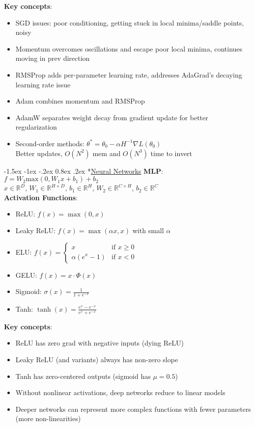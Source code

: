 \documentclass{article}
\makeatletter
\renewcommand\section{\@startsection{section}{1}{\z@}%
                                  {-1.5ex \@plus -1ex \@minus -.2ex}%
                                  {0.8ex \@plus.2ex}%
                                  {\normalfont\small\bfseries}}
\makeatother
\begin{document}
\begin{multicols}{3}
\textbf{Key concepts}:
\begin{itemize}
\item SGD issues: poor conditioning, getting stuck in local minima/saddle points, noisy
\item Momentum overcomes oscillations and escape poor local minima, continues moving in prev direction
\item RMSProp adds per-parameter learning rate, addresses AdaGrad's decaying learning rate issue
\item Adam combines momentum and RMSProp
\item AdamW separates weight decay from gradient update for better regularization
\item Second-order methods: $\theta^* = \theta_0 - \alpha H^{-1} \nabla L(\theta_0)$\\
Better updates, $O(N^2)$ mem and $O(N^3)$ time to invert
\end{itemize}

\section*{\underline{Neural Networks}}
\textbf{MLP}: $f = W_2 \text{max}(0, W_1 x + b_1) + b_2$\\
$x \in \mathbb{R}^D$, $W_1 \in \mathbb{R}^{H \times D}$, $b_1 \in \mathbb{R}^H$, $W_2 \in \mathbb{R}^{C \times H}$, $b_2 \in \mathbb{R}^C$\\
\textbf{Activation Functions}:
\begin{itemize}
\item ReLU: $f(x) = \max(0, x)$
\item Leaky ReLU: $f(x) = \max(\alpha x, x)$ with small $\alpha$
\item ELU: $f(x) = \begin{cases} x & \text{if } x \geq 0 \\ \alpha(e^x - 1) & \text{if } x < 0 \end{cases}$
\item GELU: $f(x) = x \cdot \Phi(x)$
\item Sigmoid: $\sigma(x) = \frac{1}{1+e^{-x}}$
\item Tanh: $\tanh(x) = \frac{e^x - e^{-x}}{e^x + e^{-x}}$
\end{itemize}

\textbf{Key concepts}:
\begin{itemize}
\item ReLU has zero grad with negative inputs (dying ReLU)
\item Leaky ReLU (and variants) always has non-zero slope
\item Tanh has zero-centered outputs (sigmoid has $\mu = 0.5$)
\item Without nonlinear activations, deep networks reduce to linear models
\item Deeper networks can represent more complex functions with fewer parameters (more non-linearities)
\end{itemize}


\end{multicols}
\end{document}
